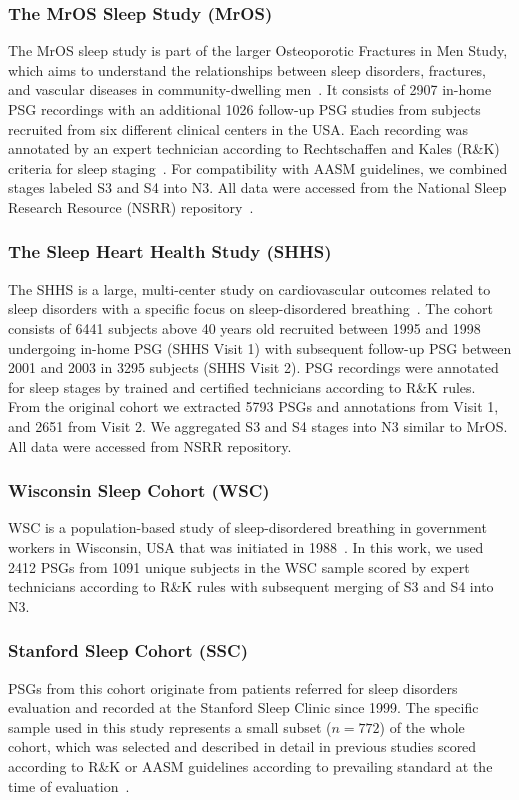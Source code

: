 \subsubsection{The MrOS Sleep Study (MrOS)}
The MrOS sleep study is part of the larger Osteoporotic Fractures in Men Study, which aims to understand the relationships between sleep disorders, fractures, and vascular diseases in community-dwelling men~\cite{Blank2005, Orwoll2005, Blackwell2011}. 
It consists of 2907 in-home PSG recordings with an additional 1026 follow-up PSG studies from subjects recruited from six different clinical centers in the USA.
Each recording was annotated by an expert technician according to Rechtschaffen and Kales (R\&K) criteria for sleep staging~\cite{Rechtschaffen1968}.
For compatibility with AASM guidelines, we combined stages labeled S3 and S4 into N3. All data were accessed from the National Sleep Research Resource (NSRR) repository~\cite{Dean2016, Zhang2018}.

\subsubsection{The Sleep Heart Health Study (SHHS)}
The SHHS is a large, multi-center study on cardiovascular outcomes related to sleep disorders with a specific focus on sleep-disordered breathing~\cite{Redline1998, Quan1997}.
The cohort consists of 6441 subjects above 40 years old recruited between 1995 and 1998 undergoing in-home PSG (SHHS Visit 1) with subsequent follow-up PSG between 2001 and 2003 in 3295 subjects (SHHS Visit 2).
PSG recordings were annotated for sleep stages by trained and certified technicians according to R\&K rules.
From the original cohort we extracted 5793 PSGs and annotations from Visit 1, and 2651 from Visit 2.
We aggregated S3 and S4 stages into N3 similar to MrOS.
All data were accessed from NSRR repository.

\subsubsection{Wisconsin Sleep Cohort (WSC)}
WSC is a population-based study of sleep-disordered breathing in government workers in Wisconsin, USA that was initiated in 1988~\cite{Young1993, Young2008}.
In this work, we used 2412 PSGs from 1091 unique subjects in the WSC sample scored by expert technicians according to R\&K rules with subsequent merging of S3 and S4 into N3.

\subsubsection{Stanford Sleep Cohort (SSC)}
PSGs from this cohort originate from patients referred for sleep disorders evaluation and recorded at the Stanford Sleep Clinic since 1999.
The specific sample used in this study represents a small subset ($n=772$) of the whole cohort, which was selected and described in detail in previous studies scored according to R\&K or AASM guidelines according to prevailing standard at the time of evaluation~\cite{Andlauer2013, Moore2014}. 


